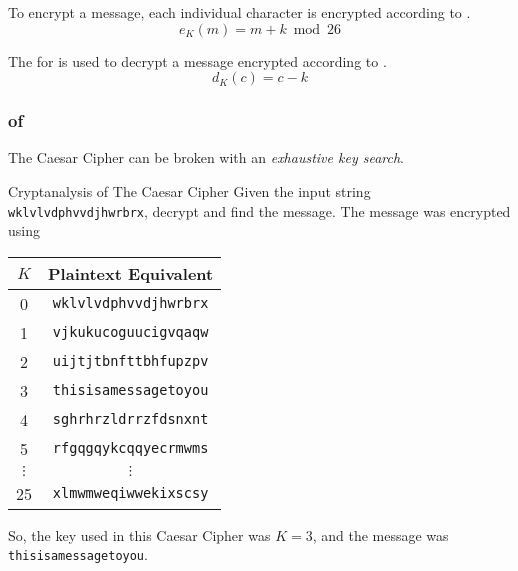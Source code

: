 To encrypt a message, each individual character is encrypted according to .
\begin{equation}\label{eq:The_Caesar_Cipher-Encryption}
  e_{K}(m) = m + k \bmod 26
\end{equation}

The  for  is used to decrypt a message encrypted according to .
\begin{equation}\label{eq:The_Caesar_Cipher-Decryption}
  d_{K}(c) = c - k
\end{equation}

\subsubsection{ of }\label{subsubsec:Cryptanalysis_Caesar_Cipher}
The Caesar Cipher can be broken with an \emph{exhaustive key search}.
\begin{example}[Lecture 4]{Cryptanalysis of The Caesar Cipher}
  Given the input string \texttt{wklvlvdphvvdjhwrbrx}, decrypt and find the message.
  The message was encrypted using 
  \tcblower{}
  \begin{center}
    \begin{tabular}{cc}
      \toprule
      $K$ & Plaintext Equivalent \\
      \midrule
      0 & \texttt{wklvlvdphvvdjhwrbrx} \\
      1 & \texttt{vjkukucoguucigvqaqw} \\
      2 & \texttt{uijtjtbnfttbhfupzpv} \\
      \midrule
      3 & \texttt{thisisamessagetoyou} \\
      \midrule
      4 & \texttt{sghrhrzldrrzfdsnxnt} \\
      5 & \texttt{rfgqgqykcqqyecrmwms} \\
      $\vdots$ & $\vdots$ \\
      25 & \texttt{xlmwmweqiwwekixscsy} \\
      \bottomrule
    \end{tabular}
  \end{center}

  So, the key used in this Caesar Cipher was $K=3$, and the message was \texttt{thisisamessagetoyou}.
\end{example}

